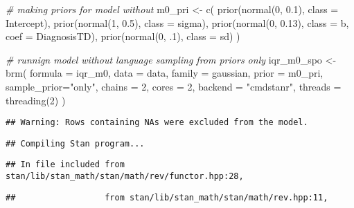 \documentclass[
]{article}
\newenvironment{Shaded}{\begin{snugshade}}{\end{snugshade}}
\newcommand{\AttributeTok}[1]{\textcolor[rgb]{0.77,0.63,0.00}{#1}}
\newcommand{\CommentTok}[1]{\textcolor[rgb]{0.56,0.35,0.01}{\textit{#1}}}
\newcommand{\DecValTok}[1]{\textcolor[rgb]{0.00,0.00,0.81}{#1}}
\newcommand{\FloatTok}[1]{\textcolor[rgb]{0.00,0.00,0.81}{#1}}
\newcommand{\FunctionTok}[1]{\textcolor[rgb]{0.00,0.00,0.00}{#1}}
\newcommand{\NormalTok}[1]{#1}
\newcommand{\OtherTok}[1]{\textcolor[rgb]{0.56,0.35,0.01}{#1}}
\newcommand{\StringTok}[1]{\textcolor[rgb]{0.31,0.60,0.02}{#1}}
\begin{document}
\begin{Shaded}
\begin{Highlighting}[]
\CommentTok{\# making priors for model without}
\NormalTok{m0\_pri }\OtherTok{\textless{}{-}} \FunctionTok{c}\NormalTok{(}
  \FunctionTok{prior}\NormalTok{(}\FunctionTok{normal}\NormalTok{(}\DecValTok{0}\NormalTok{, }\FloatTok{0.1}\NormalTok{), }\AttributeTok{class =}\NormalTok{ Intercept),}
  \FunctionTok{prior}\NormalTok{(}\FunctionTok{normal}\NormalTok{(}\DecValTok{1}\NormalTok{, }\FloatTok{0.5}\NormalTok{), }\AttributeTok{class =}\NormalTok{ sigma),}
  \FunctionTok{prior}\NormalTok{(}\FunctionTok{normal}\NormalTok{(}\DecValTok{0}\NormalTok{, }\FloatTok{0.13}\NormalTok{), }\AttributeTok{class =}\NormalTok{ b, }\AttributeTok{coef =}\NormalTok{ DiagnosisTD),}
  \FunctionTok{prior}\NormalTok{(}\FunctionTok{normal}\NormalTok{(}\DecValTok{0}\NormalTok{, .}\DecValTok{1}\NormalTok{), }\AttributeTok{class =}\NormalTok{ sd)}
\NormalTok{)}

\CommentTok{\# runnign model without language sampling from priors only}
\NormalTok{iqr\_m0\_spo }\OtherTok{\textless{}{-}} \FunctionTok{brm}\NormalTok{(}
  \AttributeTok{formula =}\NormalTok{ iqr\_m0,}
  \AttributeTok{data =}\NormalTok{ data,}
  \AttributeTok{family =}\NormalTok{ gaussian,}
  \AttributeTok{prior =}\NormalTok{ m0\_pri,}
  \AttributeTok{sample\_prior=}\StringTok{"only"}\NormalTok{,}
  \AttributeTok{chains =} \DecValTok{2}\NormalTok{,}
  \AttributeTok{cores =} \DecValTok{2}\NormalTok{,}
  \AttributeTok{backend =} \StringTok{"cmdstanr"}\NormalTok{,}
  \AttributeTok{threads =} \FunctionTok{threading}\NormalTok{(}\DecValTok{2}\NormalTok{)}
\NormalTok{)}
\end{Highlighting}
\end{Shaded}

\begin{verbatim}
## Warning: Rows containing NAs were excluded from the model.
\end{verbatim}

\begin{verbatim}
## Compiling Stan program...
\end{verbatim}

\begin{verbatim}
## In file included from stan/lib/stan_math/stan/math/rev/functor.hpp:28,
\end{verbatim}

\begin{verbatim}
##                  from stan/lib/stan_math/stan/math/rev.hpp:11,
\end{verbatim}
\end{document}
